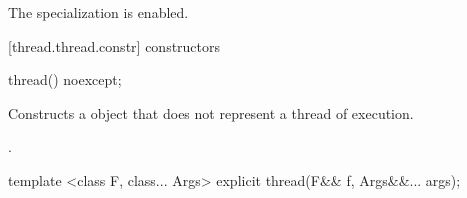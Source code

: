 \begin{itemdescr}
\pnum The specialization is enabled.
\end{itemdescr}

[thread.thread.constr]{ constructors}

%
\begin{itemdecl}
thread() noexcept;
\end{itemdecl}

\begin{itemdescr}
\pnum\effects Constructs a  object that does not represent a thread of execution.

\pnum\postconditions {}.
\end{itemdescr}

%
\begin{itemdecl}
template <class F, class... Args> explicit thread(F&& f, Args&&... args);
\end{itemdecl}

